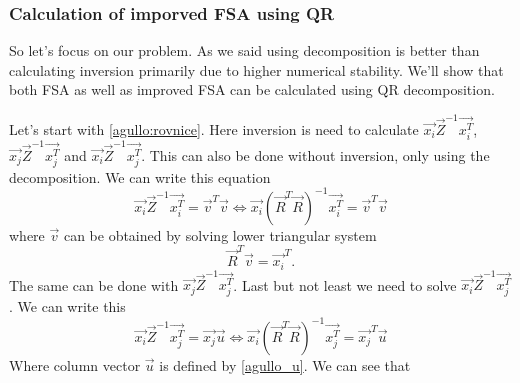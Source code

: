 


\subsubsection*{Calculation of imporved FSA using QR}
So let's focus on our problem. As we said using decomposition is better than calculating inversion primarily due to higher numerical stability. 
We'll show that both FSA as well as improved FSA can be calculated using QR decomposition.

Let's start with \ref{agullo:rovnice}. Here inversion is need to calculate 
$\vec{x_i}\vec{Z}^{-1}\vec{x_i^T}$, $\vec{x_j}\vec{Z}^{-1}\vec{x_j^T}$ and $\vec{x_i}\vec{Z}^{-1}\vec{x_j^T}$. This can also be done without inversion, only using the decomposition. We can write this equation
\begin{equation} \label{solveimi}
	\vec{x_i}\vec{Z}^{-1}\vec{x_i^T} = \vec{v}^T\vec{v} 	\iff \vec{x_i}(\vec{R}^T\vec{R})^{-1}\vec{x_i^T} = \vec{v}^T\vec{v}
\end{equation} 
where $\vec{v}$ can be obtained by solving lower triangular system
\begin{equation} \label{vsolution}
	\vec{R}^T\vec{v} = \vec{x_i}^T.
\end{equation} 
The same can be done with  $\vec{x_j}\vec{Z}^{-1}\vec{x_j^T}$. Last but not least we need to solve 
$\vec{x_i}\vec{Z}^{-1}\vec{x_j^T}$. We can write this 
\begin{equation}
	\vec{x_i}\vec{Z}^{-1}\vec{x_j^T} = \vec{x_j}\vec{u} 	\iff \vec{x_i}(\vec{R}^T\vec{R})^{-1}\vec{x_j^T} = \vec{x_j}^T\vec{u}
\end{equation} 
Where column vector $\vec{u}$ is defined by \ref{agullo_u}. We can see that 

